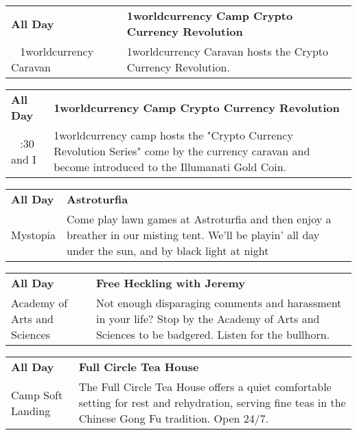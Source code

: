 
\tiny{}

\begin{tabular}{ p{1in} p{2.2in} }
    \textbf{All Day} & \textbf{1worldcurrency Camp Crypto Currency Revolution} \\
    ~ \newline 1worldcurrency Caravan & 1worldcurrency Caravan hosts the Crypto Currency Revolution. \\
    \hline 
\end{tabular}
    
\begin{tabular}{ p{1in} p{2.2in} }
    \textbf{All Day} & \textbf{1worldcurrency Camp Crypto Currency Revolution} \\
    ~ \newline 7:30 and I & 1worldcurrency camp hosts the "Crypto Currency Revolution Series" come by the currency caravan and become introduced to the Illumanati Gold Coin. \\
    \hline 
\end{tabular}
    
\begin{tabular}{ p{1in} p{2.2in} }
    \textbf{All Day} & \textbf{Astroturfia} \\
    Mystopia \newline  & Come play lawn games at Astroturfia and then enjoy a breather in our misting tent. We'll be playin' all day under the sun, and by black light at night \\
    \hline 
\end{tabular}
    
\begin{tabular}{ p{1in} p{2.2in} }
    \textbf{All Day} & \textbf{Free Heckling with Jeremy} \\
    Academy of Arts and Sciences \newline  & Not enough disparaging comments and harassment in your life?  Stop by the Academy of Arts and Sciences to be badgered.  Listen for the bullhorn. \\
    \hline 
\end{tabular}
    
\begin{tabular}{ p{1in} p{2.2in} }
    \textbf{All Day} & \textbf{Full Circle Tea House} \\
    Camp Soft Landing \newline  & The Full Circle Tea House offers a quiet comfortable setting for rest and rehydration, serving fine teas in the Chinese Gong Fu tradition. Open 24/7. \\
    \hline 
\end{tabular}
    
